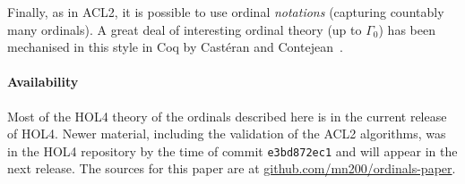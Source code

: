 \documentclass[11pt]{llncs}
\begin{document}
Finally, as in ACL2, it is possible to use ordinal \emph{notations} (capturing countably many ordinals).
A great deal of interesting ordinal theory (up to $\Gamma_0$) has been mechanised in this style in Coq by Cast\'eran and Contejean~\cite{coq-ordinals}.

\paragraph{Availability}
Most of the HOL4 theory of the ordinals described here is in the current release of HOL4.
Newer material, including the validation of the ACL2 algorithms, was in the HOL4 repository by the time of commit \texttt{e3bd872ec1} and will appear in the next release.
The sources for this paper are at \url{github.com/mn200/ordinals-paper}.



\end{document}
